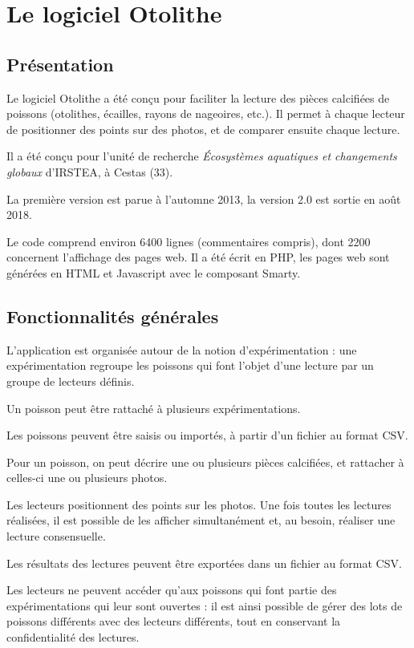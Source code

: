 \chapter{Le logiciel Otolithe}
\section{Présentation}

Le logiciel Otolithe a été conçu pour faciliter la lecture des pièces calcifiées de poissons (otolithes, écailles, rayons de nageoires, etc.). Il permet à chaque lecteur de positionner des points sur des photos, et de comparer ensuite chaque lecture.

Il a été conçu pour l'unité de recherche \textit{Écosystèmes aquatiques et changements globaux} d'IRSTEA, à Cestas (33).

La première version est parue à l'automne 2013, la version 2.0 est sortie en août 2018.

Le code comprend environ 6400 lignes (commentaires compris), dont 2200 concernent l'affichage des pages web. Il a été écrit en PHP, les pages web sont générées en HTML et Javascript avec le composant Smarty.

\section{Fonctionnalités générales}

L'application est organisée autour de la notion d'expérimentation : une expérimentation regroupe les poissons qui font l'objet d'une lecture par un groupe de lecteurs définis.

Un poisson peut être rattaché à plusieurs expérimentations.

Les poissons peuvent être saisis ou importés, à partir d'un fichier au format CSV.

Pour un poisson, on peut décrire une ou plusieurs pièces calcifiées, et rattacher à celles-ci une ou plusieurs photos.

Les lecteurs positionnent des points sur les photos. Une fois toutes les lectures réalisées, il est possible de les afficher simultanément et, au besoin, réaliser une lecture consensuelle.

Les résultats des lectures peuvent être exportées dans un fichier au format CSV.

Les lecteurs ne peuvent accéder qu'aux poissons qui font partie des expérimentations qui leur sont ouvertes : il est ainsi possible de gérer des lots de poissons différents avec des lecteurs différents, tout en conservant la confidentialité des lectures.

